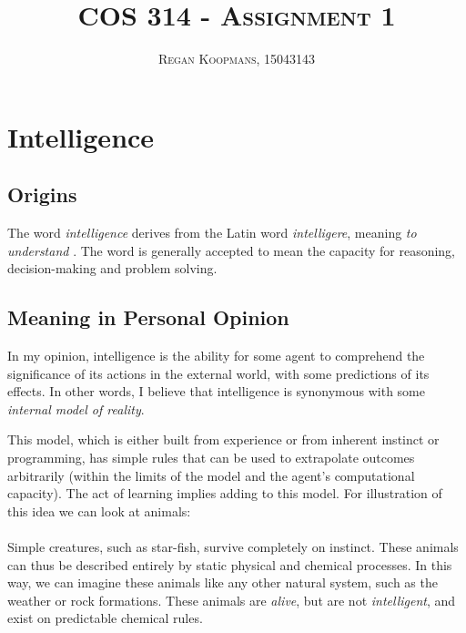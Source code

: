 \documentclass[10pt,a4paper]{article}
\author{\textsc{Regan Koopmans, 15043143}}
\title{\textsc{COS 314 - Assignment 1}}
\begin{document}
	\maketitle

		\section{Intelligence} \subsection{Origins} The word \textsl{intelligence}
		derives from the Latin word \textsl{intelligere}, meaning \textsl{to
		understand} \cite{etymonline2017}. The word is generally accepted to mean
		the capacity for reasoning, decision-making and problem solving.

			\subsection{Meaning in Personal Opinion}

				In my opinion, intelligence is the ability for some agent to comprehend
				the significance of its actions in the external world, with some
				predictions of its effects. In other words, I believe that intelligence
				is synonymous with some \textsl{internal model of reality}.

				This model, which is either built from experience or from inherent
				instinct or programming, has simple rules that can be used to
				extrapolate outcomes arbitrarily (within the limits of the model and the
				agent's computational capacity). The act of learning implies adding to
				this model. For illustration of this idea we can look at animals: \\\\
				Simple creatures, such as star-fish, survive completely on instinct.
				These animals can thus be described entirely by static physical and
				chemical processes. In this way, we can imagine these animals like any
				other natural system, such as the weather or rock formations. These
				animals are \textsl{alive}, but are not \textsl{intelligent}, and exist
				on predictable chemical rules.
\end{document}
